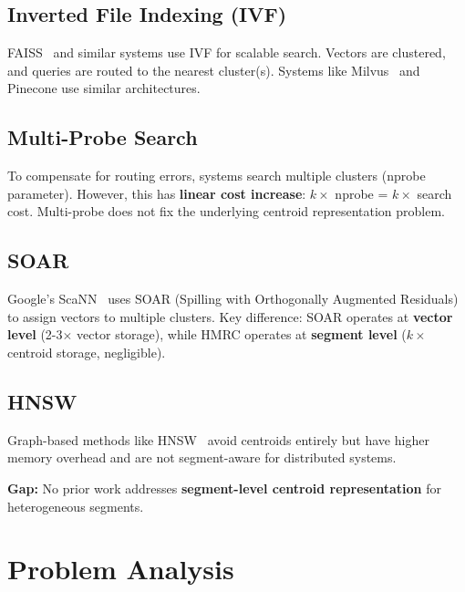 \documentclass[sigconf, nonacm]{acmart}
\begin{document}
\subsection{Inverted File Indexing (IVF)}

FAISS~\cite{johnson2019billion} and similar systems use IVF for scalable search. Vectors are clustered, and queries are routed to the nearest cluster(s). Systems like Milvus~\cite{wang2021milvus} and Pinecone use similar architectures.

\subsection{Multi-Probe Search}

To compensate for routing errors, systems search multiple clusters (nprobe parameter). However, this has \textbf{linear cost increase}: $k\times$ nprobe = $k\times$ search cost. Multi-probe does not fix the underlying centroid representation problem.

\subsection{SOAR}

Google's ScaNN~\cite{guo2020accelerating} uses SOAR (Spilling with Orthogonally Augmented Residuals) to assign vectors to multiple clusters. Key difference: SOAR operates at \textbf{vector level} (2-3$\times$ vector storage), while HMRC operates at \textbf{segment level} ($k\times$ centroid storage, negligible).

\subsection{HNSW}

Graph-based methods like HNSW~\cite{malkov2018efficient} avoid centroids entirely but have higher memory overhead and are not segment-aware for distributed systems.

\textbf{Gap:} No prior work addresses \textbf{segment-level centroid representation} for heterogeneous segments.


\section{Problem Analysis}
\label{sec:problem}
\end{document}
